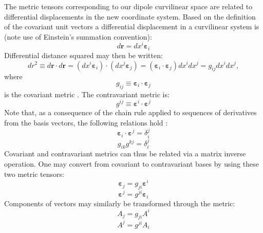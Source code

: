 \documentclass[11pt,letterpaper]{article}
\begin{document}
The metric tensors corresponding to our dipole curvilinear space are related to differential displacements in the new coordinate system.  Based on the definition of the covariant unit vectors a differential displacement in a curvilinear system is (note use of Einstein's summation convention):
\begin{equation}
d \mathbf{r} = d x^i \boldsymbol{\varepsilon}_i \label{eqn:dr}
\end{equation}
Differential distance squared may then be written:
\begin{equation}
dr^2 \equiv d \mathbf{r} \cdot d \mathbf{r} = \left(d x^i \boldsymbol{\varepsilon}_i \right) \cdot \left( d x^j \boldsymbol{\varepsilon}_j \right) = \left( \boldsymbol{\varepsilon}_i \cdot \boldsymbol{\varepsilon}_j \right) dx^i dx^j = g_{ij} dx^i dx^j,
\end{equation}
where
\begin{equation}
g_{ij} \equiv \boldsymbol{\varepsilon}_i \cdot \boldsymbol{\varepsilon}_j
\end{equation}
is the covariant metric \citep{Arfken7th}.  The contravariant metric is:
\begin{equation}
g^{ij} \equiv \boldsymbol{\varepsilon}^i \cdot \boldsymbol{\varepsilon}^j
\end{equation}
Note that, as a consequence of the chain rule applied to sequences of derivatives from the basis vectors, the following relations hold \citep{Arfken7th}:
\begin{equation}
\boldsymbol{\varepsilon}_i \cdot \boldsymbol{\varepsilon}^j = \delta_i^j
\end{equation}
\begin{equation}
g_{ik} g^{kj} = \delta_i^j
\end{equation}
Covariant and contravariant metrics can thus be related via a matrix inverse operation.  One may convert from covariant to contravariant bases by using these two metric tensors:
\begin{equation}
\boldsymbol{\varepsilon}_j = g_{ji} \boldsymbol{\varepsilon}^i
\end{equation}
\begin{equation}
\boldsymbol{\varepsilon}^j = g^{ji} \boldsymbol{\varepsilon}_i
\end{equation}
Components of vectors may similarly be transformed through the metric:
\begin{equation}
A_j = g_{ji} A^i
\end{equation}
\begin{equation}
A^j = g^{ji} A_i
\end{equation}
\end{document}
